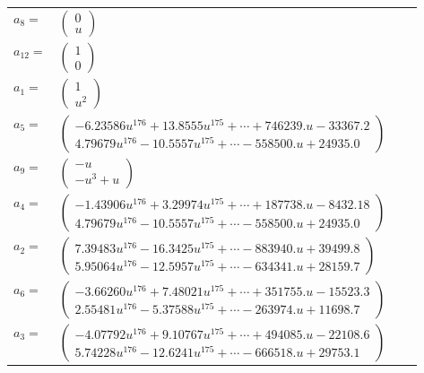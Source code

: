 \documentclass[1p]{elsarticle_modified}
\theoremstyle{definition}
\begin{document}
\begin{tabular}{m{7pt} m{180pt} m{7pt} m{180pt} }
\flushright $a_{8}=$&$\begin{pmatrix}0\\u\end{pmatrix}$ \\
\flushright $a_{12}=$&$\begin{pmatrix}1\\0\end{pmatrix}$ \\
\flushright $a_{1}=$&$\begin{pmatrix}1\\u^2\end{pmatrix}$ \\
\flushright $a_{5}=$&$\begin{pmatrix}-6.23586 u^{176}+13.8555 u^{175}+\cdots+746239. u-33367.2\\4.79679 u^{176}-10.5557 u^{175}+\cdots-558500. u+24935.0\end{pmatrix}$ \\
\flushright $a_{9}=$&$\begin{pmatrix}- u\\- u^3+u\end{pmatrix}$ \\
\flushright $a_{4}=$&$\begin{pmatrix}-1.43906 u^{176}+3.29974 u^{175}+\cdots+187738. u-8432.18\\4.79679 u^{176}-10.5557 u^{175}+\cdots-558500. u+24935.0\end{pmatrix}$ \\
\flushright $a_{2}=$&$\begin{pmatrix}7.39483 u^{176}-16.3425 u^{175}+\cdots-883940. u+39499.8\\5.95064 u^{176}-12.5957 u^{175}+\cdots-634341. u+28159.7\end{pmatrix}$ \\
\flushright $a_{6}=$&$\begin{pmatrix}-3.66260 u^{176}+7.48021 u^{175}+\cdots+351755. u-15523.3\\2.55481 u^{176}-5.37588 u^{175}+\cdots-263974. u+11698.7\end{pmatrix}$ \\
\flushright $a_{3}=$&$\begin{pmatrix}-4.07792 u^{176}+9.10767 u^{175}+\cdots+494085. u-22108.6\\5.74228 u^{176}-12.6241 u^{175}+\cdots-666518. u+29753.1\end{pmatrix}$ \\

\end{tabular}
\end{document}
